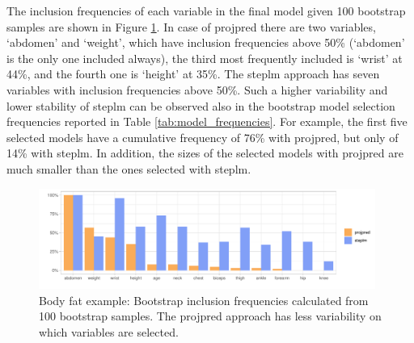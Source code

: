 \documentclass[a4]{article}
\theoremstyle{definition}
\begin{document}
The inclusion frequencies of each variable in the final model given 100
bootstrap samples are shown in Figure
\ref{fig:inclusion_frequencies}. In case of projpred there are two
variables, `abdomen' and `weight', which have inclusion frequencies
above 50\% (`abdomen' is the only one included always), the third most
frequently included is `wrist' at 44\%, and the fourth one is `height'
at 35\%.  The steplm approach has seven variables with inclusion
frequencies above 50\%. Such a higher variability and lower stability
of steplm can be observed also in the bootstrap model selection
frequencies reported in Table \ref{tab:model_frequencies}. For
example, the first five selected models have a cumulative frequency of
76\% with projpred, but only of 14\% with steplm. In addition, the
sizes of the selected models with projpred are much smaller than the ones 
selected with steplm.
\begin{figure}[tp]
  \centering
  \includegraphics[width=0.98\textwidth]{graphics/inc_prob.pdf}
  \vspace{-0.7\baselineskip}
  \caption{Body fat example: Bootstrap inclusion frequencies calculated from 100 bootstrap samples. The projpred approach has less variability on which variables are selected.}
  \label{fig:inclusion_frequencies}
\end{figure}
\end{document}
